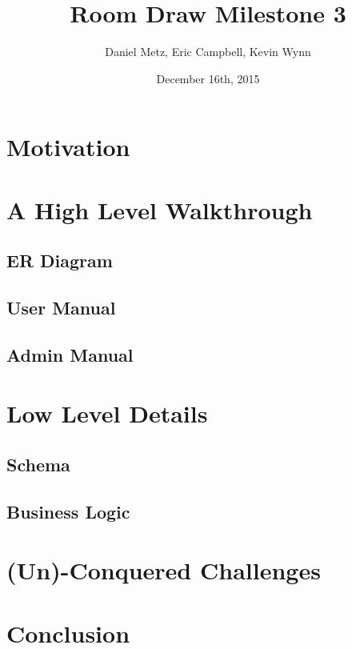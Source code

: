 \documentclass{article}
\title{Room Draw Milestone 3}
\author{Daniel Metz, Eric Campbell, Kevin Wynn}
\date{December 16th, 2015}
\begin{document}
\maketitle

\section{Motivation}


% 

\section{A High Level Walkthrough}
  \subsection{ER Diagram}
  

  \subsection{User Manual}
  

  \subsection{Admin Manual}
  

\section{Low Level Details}
  \subsection{Schema}
  

  \subsection{Business Logic}
  

\section{(Un)-Conquered Challenges}

\section{Conclusion}
\end{document}
